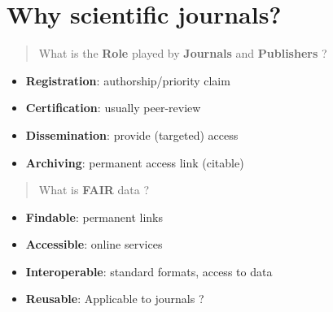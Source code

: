 \documentclass[10pt,compress,serif,aspectratio=169]{beamer}
\begin{document}
\section{Why scientific journals?}
\begin{frame}[t]%
 \vskip1cm%

   \begin{quote}
     What is the {\Large \textbf{Role}} played by {\Large \textbf{Journals}} and {\Large \textbf{Publishers}} ?\newline
\end{quote}

\begin{itemize}
\item \textbf{Registration}: authorship/priority claim
\item \textbf{Certification}: usually peer-review
\item \textbf{Dissemination}: provide (targeted) access
\item \textbf{Archiving}: permanent access link (citable) 
\end{itemize}
\vfill

   \begin{quote}
     What is {\Large \textbf{FAIR}} data ?\newline
\end{quote}

\begin{itemize}
\item \textbf{Findable}: permanent links
\item \textbf{Accessible}: online services
\item \textbf{Interoperable}: standard formats, access to data
\item \textbf{Reusable}: {\color{red} Applicable to journals ?}
\end{itemize}
 \end{frame}

\end{document}
